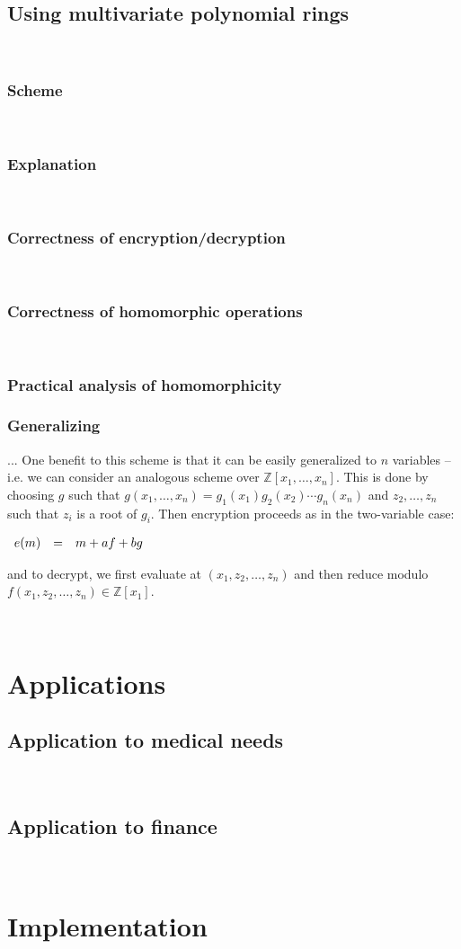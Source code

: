 \documentclass[11pt]{report}
\newcommand{\Z}{\mathbb{Z}}
\newcommand{\ba}{\\ \begin{array}{rcl}}
\newcommand{\ea}{\end{array} \\}
\newcommand{\Zxn}{\mathbb{Z}[x_1,\ldots,x_n]}
\begin{document}
\

\subsection{Using multivariate polynomial rings}

\

\subsubsection{Scheme}

\

\subsubsection{Explanation}

\

\subsubsection{Correctness of encryption/decryption}

\

\subsubsection{Correctness of homomorphic operations}

\

\subsubsection{Practical analysis of homomorphicity}

\subsubsection{Generalizing}

... One benefit to this scheme is that it can be easily generalized to $n$ variables -- i.e. we can consider an analogous scheme over $\Zxn$. This is done by choosing $g$ such that $g(x_1,\ldots,x_n) = g_1(x_1)g_2(x_2)\cdots g_n(x_n)$ and $z_2,\ldots,z_n$ such that $z_i$ is a root of $g_i$. Then encryption proceeds as in the two-variable case:

$\ba
e(m) & = & m + af + bg
\ea$

and to decrypt, we first evaluate at $(x_1,z_2,\ldots,z_n)$ and then reduce modulo $f(x_1,z_2,\ldots,z_n) \in \Z[x_1]$.

\


\section{Applications}

\subsection{Application to medical needs}

\

\subsection{Application to finance}

\

\section{Implementation}

\
\end{document}
